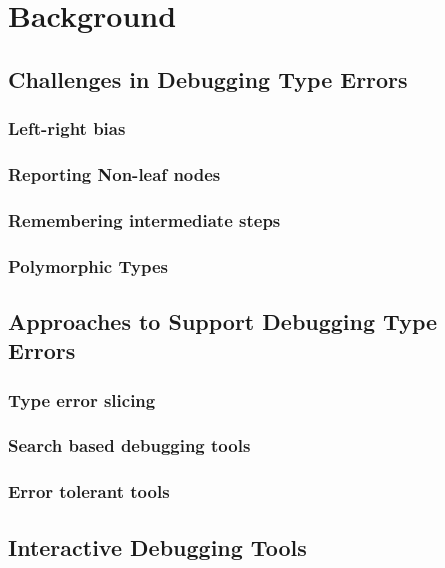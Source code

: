 


\chapter{Background}
\label{chapter2} 




\section{Challenges in Debugging Type Errors}

\subsection{Left-right bias}


\subsection{Reporting Non-leaf nodes}

\subsection{Remembering intermediate steps}

\subsection{Polymorphic Types}

\section{Approaches to Support Debugging Type Errors}

\subsection{Type error slicing}

\subsection{Search based debugging tools}

\subsection{Error tolerant tools}

\section{Interactive Debugging Tools}


